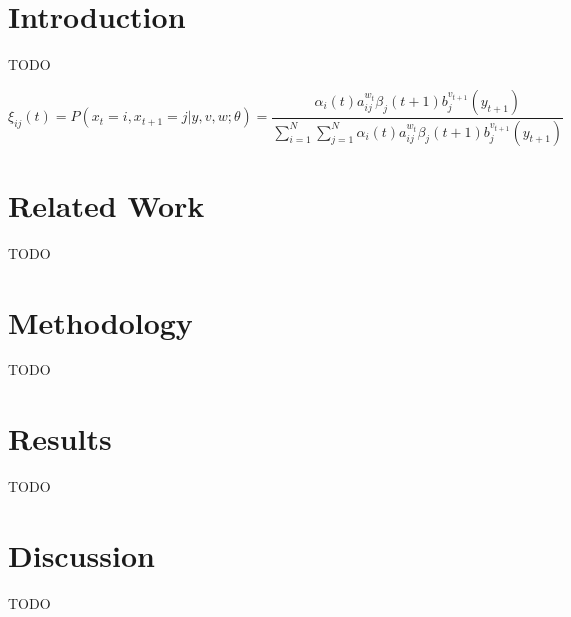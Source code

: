 \documentclass{article}
\begin{document}
\section{Introduction}
TODO


\begin{equation}
	\xi _{ij}(t)=P(x_{t}=i,x_{t+1}=j|y,v,w;\theta)= {\frac {\alpha _{i}(t)a^{w_t}_{ij}\beta _{j}(t+1)b^{v_{t+1}}_{j}(y_{t+1})}{\sum _{i=1}^{N} \sum _{j=1}^{N} \alpha _{i}(t)a^{w_t}_{ij}\beta _{j}(t+1)b^{v_{t+1}}_{j}(y_{t+1})}}
\end{equation}



\section{Related Work}
TODO

\section{Methodology}
TODO

\section{Results}
TODO

\section{Discussion}
TODO



\end{document}

